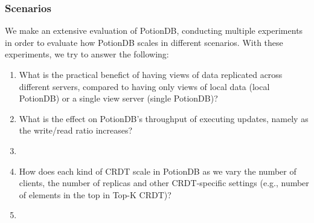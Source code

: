\documentclass{vldb}
\newcommand{\grumbler}[2]{{\color{red}{\bf #1:} #2}}
\renewcommand{\grumbler}[2]{}
\newcommand{\andre}[1]{\grumbler{andre}{#1}}
\begin{document}
\subsubsection{Scenarios}

We make an extensive evaluation of PotionDB, conducting multiple experiments in order to evaluate how PotionDB scales in different scenarios. %
With these experiments, we try to answer the following:

\begin{enumerate}
	\item \label{enum:question1} What is the practical benefict of having views of data replicated across different servers, compared to having only views of local data (local PotionDB) or a single view server (single PotionDB)?
	\item \label{enum:question2}What is the effect on PotionDB's throughput of executing updates, namely as the write/read ratio increases?
	\item \label{enum:question3} \andre{Note: Before there used to be a section for how PotionDB scales by grouping operations. Now that doesn't seem to have much effect (about same throughput, but with less clients). But maybe this could help in the scenario with latency added. Should I still do this?}
	\item\label{enum:question4}How does each kind of CRDT scale in PotionDB as we vary the number of clients, the number of replicas and other CRDT-specific settings (e.g., number of elements in the top in Top-K CRDT)?
	\item\label{enum:question5}\andre{Any other question/evaluation?}
\end{enumerate}
\end{document}
